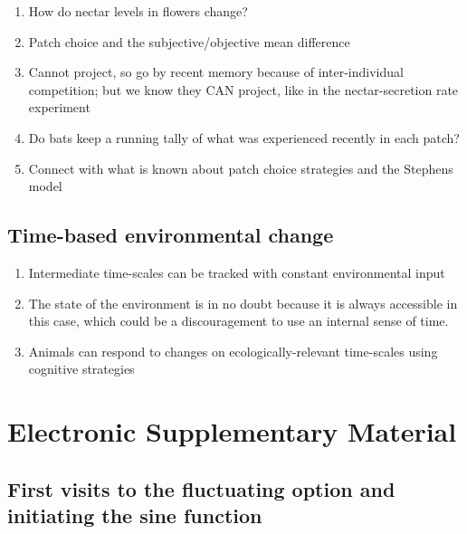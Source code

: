 \documentclass[
]{article}
\providecommand{\tightlist}{%
  \setlength{\itemsep}{0pt}\setlength{\parskip}{0pt}}
\begin{document}
\begin{enumerate}
\def\labelenumi{\arabic{enumi}.}
\tightlist
\item
  How do nectar levels in flowers change?
\item
  Patch choice and the subjective/objective mean difference
\item
  Cannot project, so go by recent memory because of inter-individual competition; but we know they CAN project, like in the nectar-secretion rate experiment
\item
  Do bats keep a running tally of what was experienced recently in each patch?
\item
  Connect with what is known about patch choice strategies and the Stephens model
\end{enumerate}

\hypertarget{time-based-environmental-change}{%
\subsection{Time-based environmental change}\label{time-based-environmental-change}}

\begin{enumerate}
\def\labelenumi{\arabic{enumi}.}
\tightlist
\item
  Intermediate time-scales can be tracked with constant environmental input
\item
  The state of the environment is in no doubt because it is always accessible in this case, which could be a discouragement to use an internal sense of time.
\item
  Animals can respond to changes on ecologically-relevant time-scales using cognitive strategies
\end{enumerate}

\newpage

\hypertarget{electronic-supplementary-material}{%
\section*{Electronic Supplementary Material}\label{electronic-supplementary-material}}

\setcounter{table}{0}  \renewcommand{\thetable}{S\arabic{table}} \setcounter{figure}{0} \renewcommand{\thefigure}{S\arabic{figure}}

\hypertarget{first-visits-to-the-fluctuating-option-and-initiating-the-sine-function}{%
\subsection{First visits to the fluctuating option and initiating the sine function}\label{first-visits-to-the-fluctuating-option-and-initiating-the-sine-function}}
\end{document}
